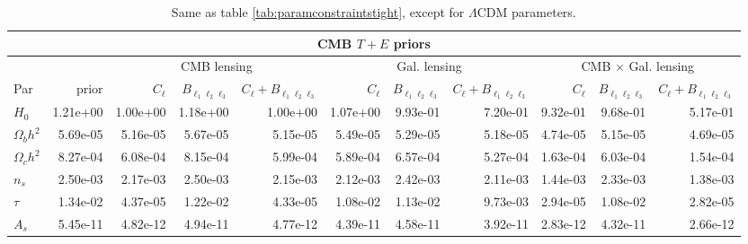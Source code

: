 \documentclass[11pt]{article} %
\begin{document}
\begin{table}[h!]
\begin{tabular}{|l|r|rrr|rrr|rrr|}
        \hline
        \multicolumn{11}{|c|}{CMB $T + E$ priors} \\
        \hline
        && \multicolumn{3}{c|}{CMB lensing}& \multicolumn{3}{c|}{Gal. lensing}& \multicolumn{3}{c|}{CMB $\times$ Gal. lensing} \\
        \hline
         Par            &   prior &   $C_\ell$ &   $B_{\ell_1\ell_2\ell_3}$ &   $C_\ell + B_{\ell_1\ell_2\ell_3}$ &   $C_\ell$ &   $B_{\ell_1\ell_2\ell_3}$ &   $C_\ell + B_{\ell_1\ell_2\ell_3}$ &   $C_\ell$ &   $B_{\ell_1\ell_2\ell_3}$ &   $C_\ell + B_{\ell_1\ell_2\ell_3}$ \\
        \hline
        $H_0$          &    1.21e+00 &  1.00e+00 &  1.18e+00 &        1.00e+00 & 1.07e+00 & 9.93e-01 &      7.20e-01 &      9.32e-01 &      9.68e-01 &             5.17e-01 \\
        $\Omega_b h^2$ &    5.69e-05 &  5.16e-05 &  5.67e-05 &        5.15e-05 & 5.49e-05 & 5.29e-05 &      5.18e-05 &      4.74e-05 &      5.15e-05 &             4.69e-05 \\
        $\Omega_c h^2$ &    8.27e-04 &  6.08e-04 &  8.15e-04 &        5.99e-04 & 5.89e-04 & 6.57e-04 &      5.27e-04 &      1.63e-04 &      6.03e-04 &             1.54e-04 \\
        $n_s$          &    2.50e-03 &  2.17e-03 &  2.50e-03 &        2.15e-03 & 2.12e-03 & 2.42e-03 &      2.11e-03 &      1.44e-03 &      2.33e-03 &             1.38e-03 \\
        $\tau$         &    1.34e-02 &  4.37e-05 &  1.22e-02 &        4.33e-05 & 1.08e-02 & 1.13e-02 &      9.73e-03 &      2.94e-05 &      1.08e-02 &             2.82e-05 \\
        $A_s$          &    5.45e-11 &  4.82e-12 &  4.94e-11 &        4.77e-12 & 4.39e-11 & 4.58e-11 &      3.92e-11 &      2.83e-12 &      4.32e-11 &             2.66e-12 \\
       \hline
        \end{tabular}
        \caption{Same as table \ref{tab:paramconstraintstight}, except for $\Lambda$CDM parameters.}
        \label{tab:paramconstraintsall}
\end{table}
\end{document}
